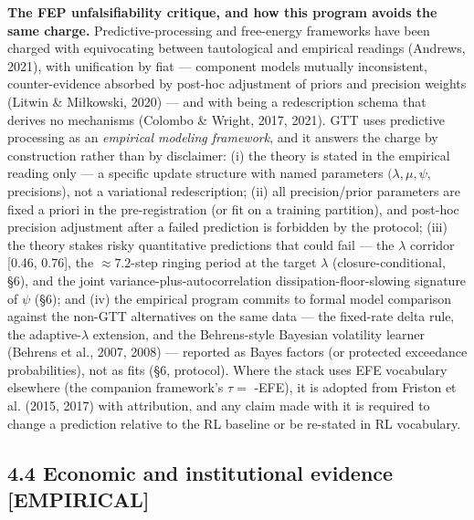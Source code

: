 \documentclass[11pt,twocolumn]{article}
\theoremstyle{gttdef}
\theoremstyle{gttplain}
\begin{document}
\textbf{The FEP unfalsifiability critique, and how this program avoids the same charge.} Predictive-processing and free-energy frameworks have been charged with equivocating between tautological and empirical readings (Andrews, 2021), with unification by fiat --- component models mutually inconsistent, counter-evidence absorbed by post-hoc adjustment of priors and precision weights (Litwin \& Miłkowski, 2020) --- and with being a redescription schema that derives no mechanisms (Colombo \& Wright, 2017, 2021). GTT uses predictive processing as an \emph{empirical modeling framework}, and it answers the charge by construction rather than by disclaimer: (i) the theory is stated in the empirical reading only --- a specific update structure with named parameters $(\lambda, \mu, \psi,$ precisions), not a variational redescription; (ii) all precision/prior parameters are fixed a priori in the pre-registration (or fit on a training partition), and post-hoc precision adjustment after a failed prediction is forbidden by the protocol; (iii) the theory stakes risky quantitative predictions that could fail --- the $\lambda$ corridor [0.46, 0.76], the $\approx7.2$-step ringing period at the target $\lambda$ (closure-conditional, \S{}6), and the joint variance-plus-autocorrelation dissipation-floor-slowing signature of $\psi$ (\S{}6); and (iv) the empirical program commits to formal model comparison against the non-GTT alternatives on the same data --- the fixed-rate delta rule, the adaptive-$\lambda$ extension, and the Behrens-style Bayesian volatility learner (Behrens et al., 2007, 2008) --- reported as Bayes factors (or protected exceedance probabilities), not as fits (\S{}6, protocol). Where the stack uses EFE vocabulary elsewhere (the companion framework's $\tau =$ -EFE), it is adopted from Friston et al. (2015, 2017) with attribution, and any claim made with it is required to change a prediction relative to the RL baseline or be re-stated in RL vocabulary.

\subsection*{4.4 Economic and institutional evidence [EMPIRICAL]}
\end{document}
